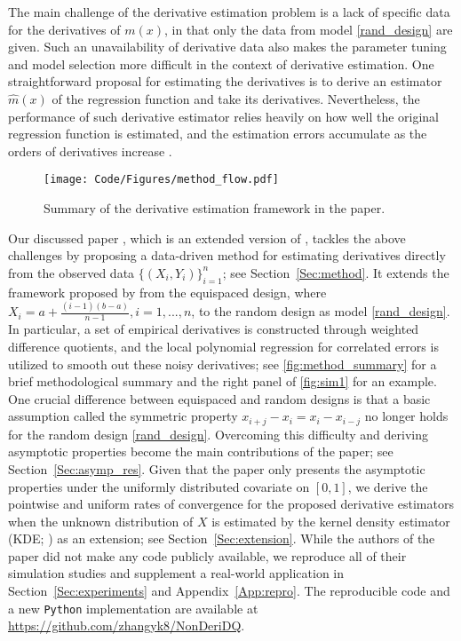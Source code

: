 \documentclass{uwstat572}
\theoremstyle{definition}
\renewcommand{\hat}{\widehat}
\theoremstyle{theorem}
\begin{document}
The main challenge of the derivative estimation problem is a lack of specific data for the derivatives of $m(x)$, in that only the data from model \eqref{rand_design} are given. Such an unavailability of derivative data also makes the parameter tuning and model selection more difficult in the context of derivative estimation. One straightforward proposal for estimating the derivatives is to derive an estimator $\hat{m}(x)$ of the regression function and take its derivatives. Nevertheless, the performance of such derivative estimator relies heavily on how well the original regression function is estimated, and the estimation errors accumulate as the orders of derivatives increase \citep{de2013derivative}. 

\begin{figure}
	\centering
	\texttt{[image: Code/Figures/method\_flow.pdf]}
	\caption{Summary of the derivative estimation framework in the paper.}
	\label{fig:method_summary}
\end{figure}

Our discussed paper \citep{liu2020smoothed}, which is an extended version of \cite{liu2018derivative}, tackles the above challenges by proposing a data-driven method for estimating derivatives directly from the observed data $\{(X_i,Y_i)\}_{i=1}^n$; see Section~\ref{Sec:method}. It extends the framework proposed by \cite{de2013derivative} from the equispaced design, where $X_i=a+\frac{(i-1)(b-a)}{n-1},i=1,...,n$, to the random design as model \eqref{rand_design}. In particular, a set of empirical derivatives is constructed through weighted difference quotients, and the local polynomial regression for correlated errors \citep{de2018local} is utilized to smooth out these noisy derivatives; see \autoref{fig:method_summary} for a brief methodological summary and the right panel of \autoref{fig:sim1} for an example. One crucial difference between equispaced and random designs is that a basic assumption called the symmetric property $x_{i+j}-x_i=x_i-x_{i-j}$ no longer holds for the random design \eqref{rand_design}. Overcoming this difficulty and deriving asymptotic properties become the main contributions of the paper; see Section~\ref{Sec:asymp_res}. Given that the paper only presents the asymptotic properties under the uniformly distributed covariate on $[0,1]$, we derive the pointwise and uniform rates of convergence for the proposed derivative estimators when the unknown distribution of $X$ is estimated by the kernel density estimator (KDE; \citealt{rosenblatt1956remarks,parzen1962estimation,chen2017tutorial}) as an extension; see Section~\ref{Sec:extension}. While the authors of the paper did not make any code publicly available, we reproduce all of their simulation studies and supplement a real-world application in Section~\ref{Sec:experiments} and Appendix~\ref{App:repro}. The reproducible code and a new \texttt{Python} implementation are available at \url{https://github.com/zhangyk8/NonDeriDQ}.
\end{document}
